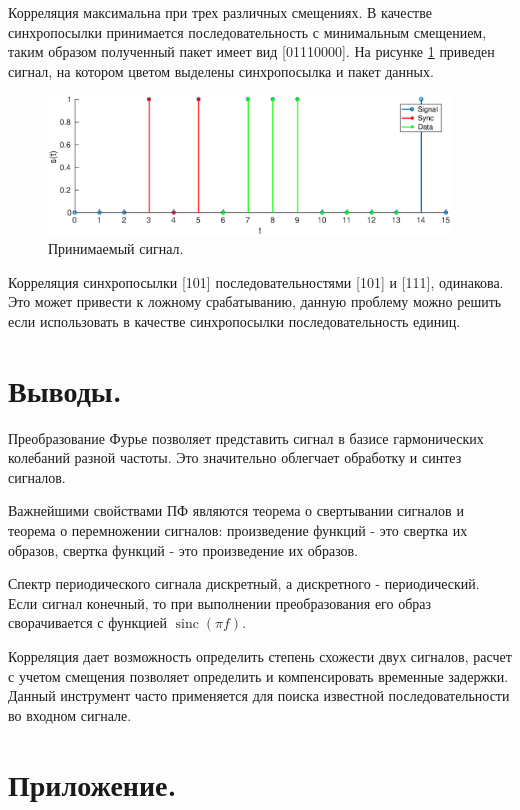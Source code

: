 \documentclass[a4paper,14pt]{extarticle}
\DeclareMathOperator{\sinc}{sinc}
\begin{document}
Корреляция максимальна при трех различных смещениях. В качестве синхропосылки принимается последовательность с минимальным смещением, таким образом полученный пакет имеет вид [01110000]. На рисунке \ref{corr_on_s} приведен сигнал, на котором цветом выделены синхропосылка и пакет данных.

\begin{figure}[H]
\centering
\includegraphics[width=0.95\textwidth]{corr_on_sig.eps}
\captionsetup{justification=centering,margin=1cm}
\caption{Принимаемый сигнал.}
\label{corr_on_s}
\end{figure}

Корреляция синхропосылки [101] последовательностями [101] и [111], одинакова. Это может привести к ложному срабатыванию, данную проблему можно решить если использовать в качестве синхропосылки последовательность единиц. 

\section{Выводы.}

Преобразование Фурье позволяет представить сигнал в базисе гармонических колебаний разной частоты. Это значительно облегчает обработку и синтез сигналов.

Важнейшими свойствами ПФ являются теорема о свертывании сигналов и теорема о перемножении сигналов: произведение функций - это свертка их образов, свертка функций - это произведение их образов.

Спектр периодического сигнала дискретный, а дискретного - периодический. Если сигнал конечный, то при выполнении преобразования его образ сворачивается с функцией $\sinc(\pi f)$. 

Корреляция дает возможность определить степень схожести двух сигналов, расчет с учетом смещения позволяет определить и компенсировать временные задержки. Данный инструмент часто применяется для поиска известной последовательности во входном сигнале.

\section{Приложение.}






\end{document}
